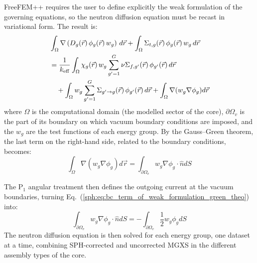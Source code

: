 FreeFEM++ requires the user to define explicitly the weak formulation of the governing equations, so the neutron diffusion equation must be recast in variational form. The result is:
%
\begin{align}
&\int_{\Omega} \nabla \left( D_g(\vec{r}) \, \phi_g(\vec{r}) \, w_g \right) \, d\vec{r}
+ \int_{\Omega} \Sigma_{t,g}(\vec{r}) \, \phi_g(\vec{r}) \, w_g \, d\vec{r} \notag \\
&= \frac{1}{k_{\mathrm{eff}}} \int_{\Omega} \chi_g(\vec{r}) \, w_g \sum_{g'=1}^{G} \nu \Sigma_{f,g'}(\vec{r}) \, \phi_{g'}(\vec{r}) \, d\vec{r} \notag \\
&\quad + \int_{\Omega} w_g \sum_{g'=1}^{G} \Sigma_{g' \rightarrow g}(\vec{r}) \, \phi_{g'}(\vec{r}) \, d\vec{r}
+ \int_{\Omega} \nabla(w_g \nabla \phi_g) d\vec{r}
\label{sph:eq:diffusion_weak_formulation}
\end{align}
%
where $\Omega$ is the computational domain (the modelled sector of the core), $\partial \Omega_v$ is the part of its boundary on which vacuum boundary conditions are imposed, and the $w_g$ are the test functions of each energy group. By the Gauss--Green theorem, the last term on the right-hand side, related to the boundary conditions, becomes:
%
\begin{equation}
    \int_{\Omega} \nabla(w_g \nabla \phi_g) d\vec{r} = \int_{\partial \Omega_v}  w_g \nabla \phi_g \cdot \hat{n}dS
    \label{sph:eq:bc_term_of_weak_formulation_green_theo}
\end{equation}

The P$_1$ angular treatment then defines the outgoing current at the vacuum boundaries, turning Eq.~(\ref{sph:eq:bc_term_of_weak_formulation_green_theo}) into:
%
\begin{equation}
  \int_{\partial \Omega_v}  w_g \nabla \phi_g \cdot \hat{n}dS = - \int_{\partial \Omega_v}  \frac{1}{2}w_g \phi_g dS
    \label{sph:eq:bc_term_of_weak_formulation_P1}
\end{equation}
%
The neutron diffusion equation is then solved for each energy group, one dataset at a time, combining SPH-corrected and uncorrected MGXS in the different assembly types of the core.

